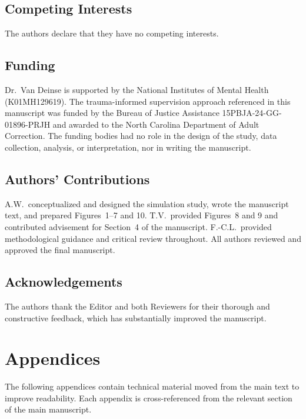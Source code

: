 \documentclass{article}[11pt]
\begin{document}
\subsection*{Competing Interests}
The authors declare that they have no competing interests.

\subsection*{Funding}
Dr.\ Van Deinse is supported by the National Institutes of Mental Health (K01MH129619). The trauma-informed supervision approach referenced in this manuscript was funded by the Bureau of Justice Assistance 15PBJA-24-GG-01896-PRJH and awarded to the North Carolina Department of Adult Correction. The funding bodies had no role in the design of the study, data collection, analysis, or interpretation, nor in writing the manuscript.

\subsection*{Authors' Contributions}
A.W.\ conceptualized and designed the simulation study, wrote the manuscript text, and prepared Figures~1--7 and 10. T.V.\ provided Figures~8 and 9 and contributed advisement for Section~4 of the manuscript. F.-C.L.\ provided methodological guidance and critical review throughout. All authors reviewed and approved the final manuscript.

\subsection*{Acknowledgements}
The authors thank the Editor and both Reviewers for their thorough and constructive feedback, which has substantially improved the manuscript.



\clearpage
\appendix
\renewcommand{\thesection}{\Alph{section}}

\section*{Appendices}
\vspace{0.5em}
\noindent The following appendices contain technical material moved from the main text to improve readability. Each appendix is cross-referenced from the relevant section of the main manuscript.
\vspace{1em}
\end{document}
